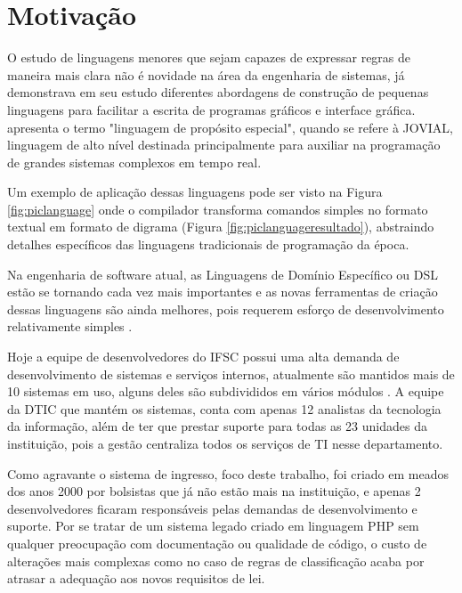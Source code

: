 \section{Motivação}
\label{motivacao}

O estudo de linguagens menores que sejam capazes de expressar regras de maneira mais clara não é novidade na área da engenharia de sistemas,  já demonstrava em seu estudo diferentes abordagens de construção de pequenas linguagens para facilitar a escrita de programas gráficos e interface gráfica.  apresenta o termo "linguagem de propósito especial", quando se refere à \gls{JOVIAL}, linguagem de alto nível destinada principalmente para auxiliar na programação de grandes sistemas complexos em tempo real. 

Um exemplo de aplicação dessas linguagens pode ser visto na Figura \ref{fig:piclanguage} onde o compilador transforma comandos simples no formato textual em formato de digrama (Figura \ref{fig:piclanguageresultado}), abstraindo detalhes específicos das linguagens tradicionais de programação da época.





Na engenharia de software atual, as Linguagens de Domínio Específico ou DSL estão se tornando cada vez mais importantes e as novas ferramentas de criação dessas linguagens são ainda melhores, pois requerem esforço de desenvolvimento relativamente simples \cite{dslengineering}.


Hoje a equipe de desenvolvedores do \gls{IFSC} possui uma alta demanda de desenvolvimento de sistemas e serviços internos, atualmente são mantidos mais de 10 sistemas em uso, alguns deles são subdivididos em vários módulos \cite{catalogoifsc}. A equipe da \gls{DTIC} que mantém os sistemas, conta com apenas 12 analistas da tecnologia da informação, além de ter que prestar suporte para todas as 23 unidades da instituição, pois a gestão centraliza todos os serviços de TI nesse departamento. 

Como agravante o sistema de ingresso, foco deste trabalho, foi criado em meados dos anos 2000 por bolsistas que já não estão mais na instituição, e apenas 2 desenvolvedores ficaram responsáveis pelas demandas de desenvolvimento e suporte. Por se tratar de um sistema legado criado em linguagem PHP sem qualquer preocupação com documentação ou qualidade de código, o custo de alterações mais complexas como no caso de regras de classificação acaba por atrasar a adequação aos novos requisitos de lei. 


